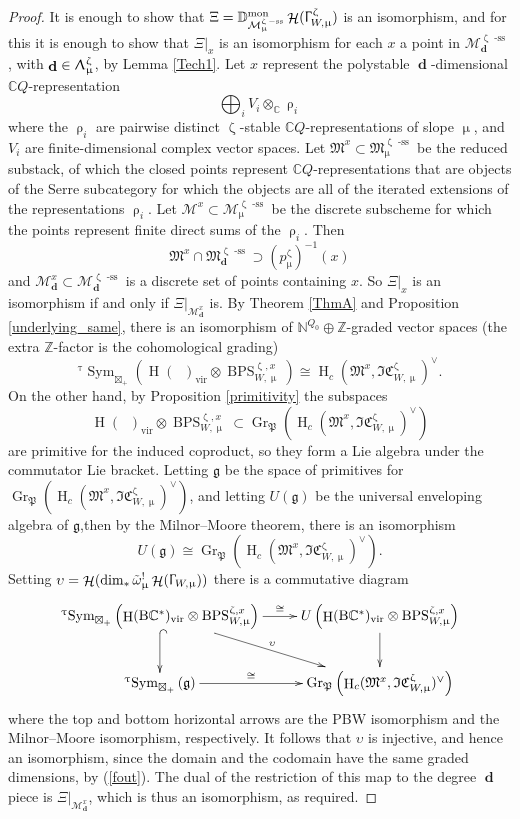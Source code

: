 \documentclass[a4paper,10pt]{amsart}
\renewcommand{\zeta}{\upzeta}
\renewcommand{\rho}{\uprho}
\renewcommand{\Lambda}{\Uplambda}
\renewcommand{\Gamma}{\Upgamma}
\renewcommand{\tau}{\uptau}
\renewcommand{\mu}{\upmu}
\DeclareMathOperator{\BC}{B\mathbb{C}^*}
\newcommand{\DD}{\mathbb{D}}
\DeclareMathOperator{\Pf}{\mathfrak{P}}
\newcommand{\ZZ}{\mathbb{Z}}
\newcommand{\Mst}{\mathfrak{M}}
\newcommand{\Msp}{\mathcal{M}}
\newcommand{\ICSt}{\mathfrak{IC}}
\DeclareMathOperator{\sst}{-ss}
\DeclareMathOperator{\mon}{mon}
\DeclareMathOperator{\Gr}{Gr}
\DeclareMathOperator{\dd}{\mathbf{d}}
\DeclareMathOperator{\DT}{BPS}
\DeclareMathOperator{\Sym}{Sym}
\DeclareMathOperator{\vir}{vir}
\DeclareMathOperator{\Ho}{\mathcal{H}}
\DeclareMathOperator{\HO}{H}
\begin{document}
\begin{proof}
It is enough to show that $\Xi=\DD^{\mon}_{\Msp_{\mu}^{\zeta\sst}}\Ho(\Gamma^{\zeta}_{W,\mu})$ is an isomorphism, and for this it is enough to show that $\Xi|_{x}$ is an isomorphism for each $x$ a point in $\Msp_{\dd}^{\zeta\sst}$, with $\dd\in\Lambda^{\zeta}_{\mu}$, by Lemma \ref{Tech1}.  Let $x$ represent the polystable $\dd$-dimensional $\mathbb{C}Q$-representation
\[
\bigoplus_i V_i\otimes_{\mathbb{C}} \rho_i
\]
where the $\rho_i$ are pairwise distinct $\zeta$-stable $\mathbb{C}Q$-representations of slope $\mu$, and $V_i$ are finite-dimensional complex vector spaces.  Let $\Mst^{x}\subset\Mst^{\zeta\sst}_{\mu}$ be the reduced substack, of which the closed points represent $\mathbb{C}Q$-representations that are objects of the Serre subcategory for which the objects are all of the iterated extensions of the representations $\rho_i$.  Let $\Msp^{x}\subset \Msp^{\zeta\sst}_{\mu}$ be the discrete subscheme for which the points represent finite direct sums of the $\rho_i$.  Then 
\[
\Mst^{x}\cap \Mst^{\zeta\sst}_{\dd}\supset (p^{\zeta}_{\mu})^{-1}(x)
\]
and $\Msp_{\dd}^x\subset \Msp_{\dd}^{\zeta\sst}$ is a discrete set of points containing $x$.  So $\Xi\lvert_x$ is an isomorphism if and only if $\Xi\lvert_{{\Msp}^x_{\dd}}$ is.  By Theorem \ref{ThmA} and Proposition \ref{underlying_same}, there is an isomorphism of $\mathbb{N}^{Q_0}\oplus\ZZ$-graded vector spaces (the extra $\ZZ$-factor is the cohomological grading)
\begin{equation}
\label{fout}
{}^{\tau}\!\Sym_{\boxtimes_+}\left(\HO(\BC )_{\vir}\otimes \DT^{\zeta,x}_{W,\mu}\right)\cong \HO_c(\Mst^x,\ICSt_{W,\mu}^{\zeta})^{\vee}.
\end{equation}
On the other hand, by Proposition \ref{primitivity} the subspaces 
\[
\HO(\BC )_{\vir}\otimes \DT^{\zeta,x}_{W,\mu}\subset \Gr_{\Pf}\left(\HO_c(\Mst^x,\ICSt_{W,\mu}^{\zeta})^{\vee}\right)
\]
are primitive for the induced coproduct, so they form a Lie algebra under the commutator Lie bracket.  Letting $\mathfrak{g}$ be the space of primitives for $\Gr_{\Pf}\left(\HO_c(\Mst^x,\ICSt_{W,\mu}^{\zeta})^{\vee}\right)$, and letting $U(\mathfrak{g})$ be the universal enveloping algebra of $\mathfrak{g}$,then by the Milnor--Moore theorem, there is an isomorphism
\[
U(\mathfrak{g})\cong \Gr_{\Pf}\left(\HO_c(\Mst^x,\ICSt_{W,\mu}^{\zeta})^{\vee}\right).
\]
Setting $\upsilon=\Ho(\dim_*\tilde{\omega}_{\mu}^!\Ho(\Gamma_{W,\mu}))$ there is a commutative diagram
\[
\xymatrix{
{}^{\tau}\!\Sym_{\boxtimes_+}\left(\HO(\BC )_{\vir}\otimes \DT^{\zeta,x}_{W,\mu}\right)\ar@{^{(}->}[d]\ar[r]^-{\cong}\ar[dr]^-{\upsilon} &U\left(\HO(\BC )_{\vir}\otimes \DT^{\zeta,x}_{W,\mu}\right)\ar[d]
\\{}^{\tau}\!\Sym_{\boxtimes_+}\left(\mathfrak{g}\right)\ar[r]^-{\cong}&\Gr_{\Pf}\left(\HO_c(\Mst^x,\ICSt_{W,\mu}^{\zeta})^{\vee}\right)
}
\]
where the top and bottom horizontal arrows are the PBW isomorphism and the Milnor--Moore isomorphism, respectively.  It follows that $\upsilon$ is injective, and hence an isomorphism, since the domain and the codomain have the same graded dimensions, by (\ref{fout}).  The dual of the restriction of this map to the degree $\dd$ piece is $\Xi|_{{\Msp}^x_{\dd}}$, which is thus an isomorphism, as required.
\end{proof}
\end{document}
